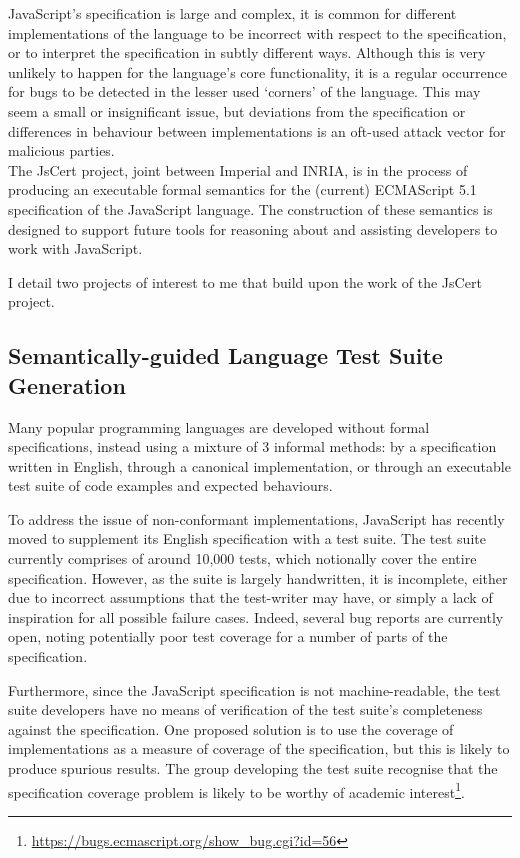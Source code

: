 \documentclass[a4paper]{article}
\begin{document}
JavaScript's specification is large and complex, it is common for
different implementations of the language to be incorrect with respect to the
specification, or to interpret the specification in subtly different ways.
Although this is very unlikely to happen for the language's core functionality,
it is a regular occurrence for bugs to be detected in the lesser used `corners'
of the language. This may seem a small or insignificant issue, but
deviations from the specification or differences in behaviour between
implementations is an oft-used attack vector for malicious parties.
\\

The JsCert project, joint between Imperial and INRIA, is in the process of
producing an executable formal semantics for the (current) ECMAScript 5.1
specification of the JavaScript language.
The construction of these semantics is designed to support future tools for
reasoning about and assisting developers to work with JavaScript.

I detail two projects of interest to me that build upon
the work of the JsCert project.

\subsection{Semantically-guided Language Test Suite Generation}
Many popular programming languages are developed without formal specifications,
instead using a mixture of 3 informal methods: by a specification written in English,
through a canonical implementation, or through an executable test suite of code
examples and expected behaviours.

To address the issue of non-conformant implementations, JavaScript has recently
moved to supplement its English specification with a test suite. The test suite
currently comprises of around 10,000 tests, which notionally cover the entire
specification. However, as the suite is largely handwritten, it is incomplete,
either due to incorrect assumptions that the test-writer may have, or simply a
lack of inspiration for all possible failure
cases. Indeed, several bug reports are currently open, noting potentially
poor test coverage for a number of parts of the specification.

Furthermore, since the JavaScript specification is not machine-readable, the
test suite developers have no means of verification of the test suite's
completeness against the specification. One proposed solution is to use the
coverage of implementations as a measure of coverage of the specification, but
this is likely to produce spurious results. The group developing the test suite
recognise that the specification coverage problem is likely to be worthy of
academic interest\footnote{\url{https://bugs.ecmascript.org/show_bug.cgi?id=56}}.
\\
\end{document}
